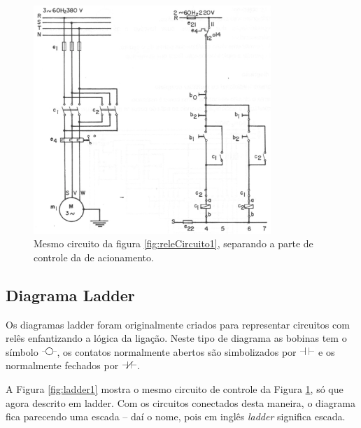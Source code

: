 \begin{figure}[hbt]
  \begin{center}
    \includegraphics[width=0.8\textwidth]{figuras/releCircuito2} %
  \end{center}
  \caption{Mesmo circuito da figura \ref{fig:releCircuito1}, separando a parte de controle da de acionamento.}
  \label{fig:releCircuito2}
\end{figure}

\subsection{Diagrama Ladder}
\label{sec:diagrama-ladder}

Os diagramas ladder foram originalmente criados para representar circuitos com relês enfantizando a lógica da ligação. Neste tipo de diagrama as bobinas tem o símbolo \includegraphics[height=0.9em]{figuras/bobina_ladder}, os contatos normalmente abertos são simbolizados por \includegraphics[height=0.9em]{figuras/na_ladder} e os normalmente fechados por \includegraphics[height=0.9em]{figuras/nf_ladder}.

A Figura \ref{fig:ladder1} mostra o mesmo circuito de controle da Figura \ref{fig:releCircuito2}, só que agora descrito em ladder. Com os circuitos conectados desta maneira, o diagrama fica parecendo uma escada -- daí o nome, pois em inglês \emph{ladder} significa escada.


